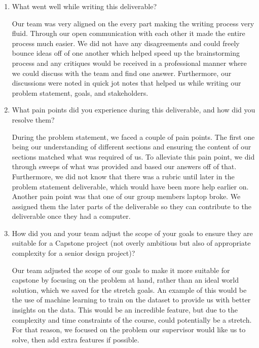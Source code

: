 \documentclass{article}
\begin{document}
\begin{enumerate}
    \item What went well while writing this deliverable? 
    
    Our team was very aligned on the every part making the writing process very fluid. Through our open communication with each other it made the entire process much easier. We did not have any disagreements and could freely bounce ideas off of one another which helped speed up the brainstorming process and any critiques would be received in a professional manner where we could discuss with the team and find one answer. Furthermore, our discussions were noted in quick jot notes that helped us while writing our problem statement, goals, and stakeholders.

    \item What pain points did you experience during this deliverable, and how
    did you resolve them?

    During the problem statement, we faced a couple of pain points. The first one being our understanding of different sections and ensuring the content of our sections matched what was required of us. To alleviate this pain point, we did through sweeps of what was provided and based our answers off of that. Furthermore, we did not know that there was a rubric until later in the problem statement deliverable, which would have been more help earlier on. Another pain point was that one of our group members laptop broke. We assigned them the later parts of the deliverable so they can contribute to the deliverable once they had a computer.

    \item How did you and your team adjust the scope of your goals to ensure
    they are suitable for a Capstone project (not overly ambitious but also of
    appropriate complexity for a senior design project)?

    Our team adjusted the scope of our goals to make it more suitable for capstone by focusing on the problem at hand, rather than an ideal world solution, which we saved for the stretch goals. An example of this would be the use of machine learning to train on the dataset to provide us with better insights on the data. This would be an incredible feature, but due to the complexity and time constraints of the course, could potentially be a stretch. For that reason, we focused on the problem our supervisor would like us to solve, then add extra features if possible.

\end{enumerate}  
\end{document}
